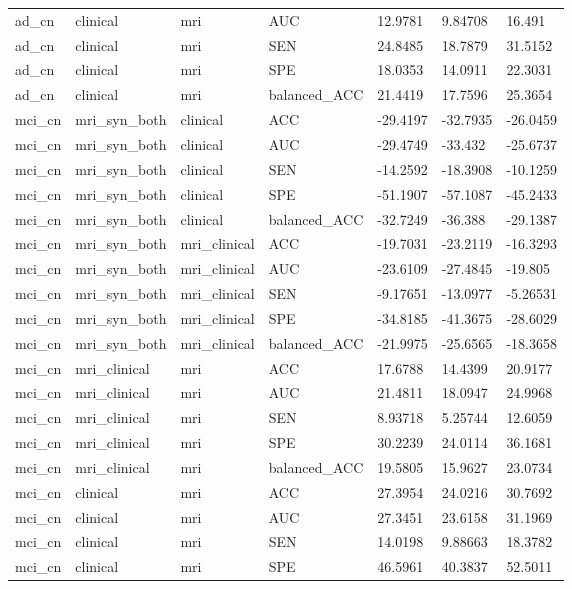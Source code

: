 \begin{landscape}
\begin{longtable}{lllllll}
ad\_cn & clinical & mri & AUC & 12.9781 & 9.84708 & 16.491 \\
ad\_cn & clinical & mri & SEN & 24.8485 & 18.7879 & 31.5152 \\
ad\_cn & clinical & mri & SPE & 18.0353 & 14.0911 & 22.3031 \\
ad\_cn & clinical & mri & balanced\_ACC & 21.4419 & 17.7596 & 25.3654 \\
mci\_cn & mri\_syn\_both & clinical & ACC & -29.4197 & -32.7935 & -26.0459 \\
mci\_cn & mri\_syn\_both & clinical & AUC & -29.4749 & -33.432 & -25.6737 \\
mci\_cn & mri\_syn\_both & clinical & SEN & -14.2592 & -18.3908 & -10.1259 \\
mci\_cn & mri\_syn\_both & clinical & SPE & -51.1907 & -57.1087 & -45.2433 \\
mci\_cn & mri\_syn\_both & clinical & balanced\_ACC & -32.7249 & -36.388 & -29.1387 \\
mci\_cn & mri\_syn\_both & mri\_clinical & ACC & -19.7031 & -23.2119 & -16.3293 \\
mci\_cn & mri\_syn\_both & mri\_clinical & AUC & -23.6109 & -27.4845 & -19.805 \\
mci\_cn & mri\_syn\_both & mri\_clinical & SEN & -9.17651 & -13.0977 & -5.26531 \\
mci\_cn & mri\_syn\_both & mri\_clinical & SPE & -34.8185 & -41.3675 & -28.6029 \\
mci\_cn & mri\_syn\_both & mri\_clinical & balanced\_ACC & -21.9975 & -25.6565 & -18.3658 \\
mci\_cn & mri\_clinical & mri & ACC & 17.6788 & 14.4399 & 20.9177 \\
mci\_cn & mri\_clinical & mri & AUC & 21.4811 & 18.0947 & 24.9968 \\
mci\_cn & mri\_clinical & mri & SEN & 8.93718 & 5.25744 & 12.6059 \\
mci\_cn & mri\_clinical & mri & SPE & 30.2239 & 24.0114 & 36.1681 \\
mci\_cn & mri\_clinical & mri & balanced\_ACC & 19.5805 & 15.9627 & 23.0734 \\
mci\_cn & clinical & mri & ACC & 27.3954 & 24.0216 & 30.7692 \\
mci\_cn & clinical & mri & AUC & 27.3451 & 23.6158 & 31.1969 \\
mci\_cn & clinical & mri & SEN & 14.0198 & 9.88663 & 18.3782 \\
mci\_cn & clinical & mri & SPE & 46.5961 & 40.3837 & 52.5011 \\

\end{longtable}
\end{landscape}
